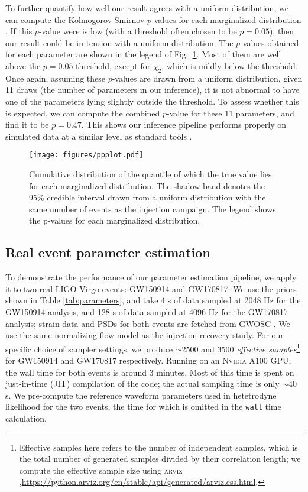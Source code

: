 \documentclass[twocolumn]{aastex631}
\begin{document}
To further quantify how well our result agrees with a uniform distribution, we
can compute the Kolmogorov-Smirnov $p$-values for each marginalized
distribution \cite{}.  If this $p$-value were is low (with a threshold often
chosen to be $p = 0.05$), then our result could be in tension with a uniform
distribution. The $p$-values obtained for each parameter are shown in the
legend of Fig.~\ref{fig:ppplot}.  Most of them are well above the $p = 0.05$
threshold, except for $\chi_2$, which is mildly below the threshold. Once
again, assuming these $p$-values are drawn from a uniform distribution, given
11 draws (the number of parameters in our inference), it is not abnormal to
have one of the parameters lying slightly outside the threshold. To assess
whether this is expected, we can compute the combined $p$-value for these 11
parameters, and find it to be $p = 0.47$.  This shows our inference pipeline
performs properly on simulated data at a similar level as standard tools
\cite{Veitch:2014wba,Romero-Shaw:2020owr}.

\begin{figure}
    \texttt{[image: figures/ppplot.pdf]}
    \caption{Cumulative distribution of the quantile of which the true value
    lies for each marginalized distribution. The shadow band denotes the 95\%
    credible interval drawn from a uniform distribution with the same number of
    events as the injection campaign. The legend shows the p-values for each
    marginalized distribution.}
    \label{fig:ppplot}
\end{figure}

\subsection{Real event parameter estimation}

To demonstrate the performance of our parameter estimation pipeline, we apply it
to two real LIGO-Virgo events: GW150914 and GW170817. We use the priors shown in
Table \ref{tab:parameters}, and take 4 s of data sampled at 2048 Hz for the
GW150914 analysis, and 128 s of data sampled at 4096 Hz for the GW170817
analysis; strain data and PSDs for both events are fetched from GWOSC
\cite{GWOSC}. We use the same normalizing flow model as the injection-recovery
study. For our specific choice of sampler settings, we produce ${\sim}$2500 and
3500 \emph{effective samples}\footnote{Effective samples here refers to the
number of independent samples, which is the total number of generated samples
divided by their correlation length; we compute the effective sample size using
\textsc{arviz}
\cite{arviz_2019},\url{https://python.arviz.org/en/stable/api/generated/arviz.ess.html}.
} for GW150914 and GW170817 respectively. Running on an \textsc{Nvidia} A100
GPU, the wall time for both events is around 3 minutes. Most of this time is
spent on just-in-time (JIT) compilation of the code; the actual sampling time is
only ${\sim}40$ s. We pre-compute the reference waveform parameters used in
hetetrodyne likelihood for the two events, the time for which is omitted in the
\texttt{wall} time calculation.
\end{document}
